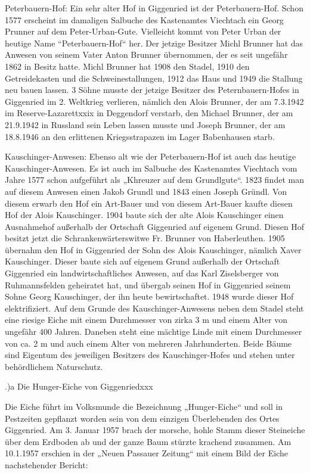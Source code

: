 \documentclass{book}
\begin{document}
Peterbauern-Hof: Ein sehr alter Hof in Giggenried ist der Peterbauern-Hof. Schon
1577 erscheint im damaligen Salbuche des Kastenamtes Viechtach ein Georg Prunner
auf dem Peter-Urban-Gute. Vielleicht kommt von Peter Urban der heutige Name
“Peterbauern-Hof“ her. Der jetzige Besitzer Michl Brunner hat das Anwesen von
seinem Vater Anton Brunner übernommen, der es seit ungefähr 1862 in Besitz
hatte. Michl Brunner hat 1908 den Stadel, 1910 den Getreidekasten und die
Schweinestallungen, 1912 das Haus und 1949 die Stallung neu bauen lassen. 3
Söhne musste der jetzige Besitzer des Peternbauern-Hofes in Giggenried im 2.
Weltkrieg verlieren, nämlich den Alois Brunner, der am 7.3.1942 im
Reserve-Lazarettxxix in Deggendorf verstarb, den Michael Brunner, der am
21.9.1942 in Russland sein Leben lassen musste und Joseph Brunner, der am
18.8.1946 an den erlittenen Kriegsstrapazen im Lager Babenhausen starb.

Kauschinger-Anwesen: Ebenso alt wie der Peterbauern-Hof ist auch das heutige
Kauschinger-Anwesen. Es ist auch im Salbuche des Kastenamtes Viechtach vom Jahre
1577 schon aufgeführt als „Khreuzer auf dem Grundlgute“. 1823 findet man auf
diesem Anwesen einen Jakob Grundl und 1843 einen Joseph Gründl. Von diesem
erwarb den Hof ein Art-Bauer und von diesem Art-Bauer kaufte diesen Hof der
Alois Kauschinger. 1904 baute sich der alte Alois Kauschinger einen Ausnahmehof
außerhalb der Ortschaft Giggenried auf eigenem Grund. Diesen Hof besitzt jetzt
die Schrankenwärterswitwe Fr. Brunner von Haberleuthen. 1905 übernahm den Hof in
Giggenried der Sohn des Alois Kauschinger, nämlich Xaver Kauschinger. Dieser
baute sich auf eigenem Grund außerhalb der Ortschaft Giggenried ein
landwirtschaftliches Anwesen, auf das Karl Ziselsberger von Ruhmannsfelden
geheiratet hat, und übergab seinen Hof in Giggenried seinem Sohne Georg
Kauschinger, der ihn heute bewirtschaftet. 1948 wurde dieser Hof elektrifiziert.
Auf dem Grunde des Kauschinger-Anwesens neben dem Stadel steht eine riesige
Eiche mit einem Durchmesser von zirka 3 m und einem Alter von ungefähr 400
Jahren. Daneben steht eine mächtige Linde mit einem Durchmesser von ca. 2 m und
auch einem Alter von mehreren Jahrhunderten. Beide Bäume sind Eigentum des
jeweiligen Besitzers des Kauschinger-Hofes und stehen unter behördlichem
Naturschutz.

.)a Die Hunger-Eiche von Giggenriedxxx

Die Eiche führt im Volksmunde die Bezeichnung „Hunger-Eiche“ und soll in
Pestzeiten gepflanzt worden sein von dem einzigen Überlebenden des Ortes
Giggenried. Am 3. Januar 1957 brach der morsche, hohle Stamm dieser Steineiche
über dem Erdboden ab und der ganze Baum stürzte krachend zusammen. Am 10.1.1957
erschien in der „Neuen Passauer Zeitung“ mit einem Bild der Eiche nachstehender
Bericht:
\end{document}
